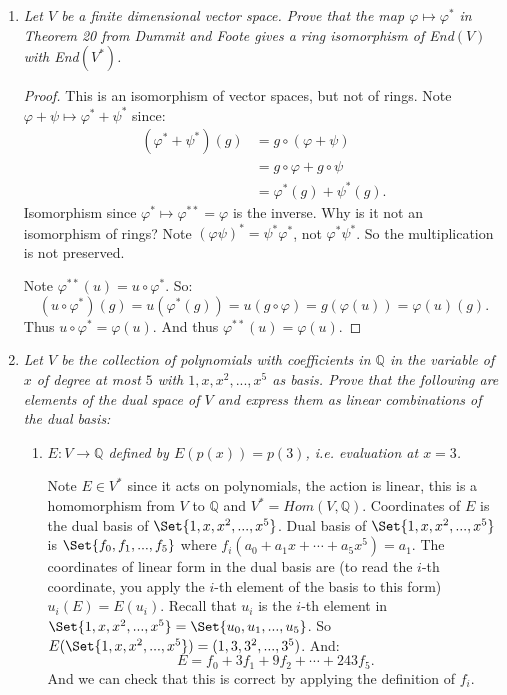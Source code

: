 \documentclass[9pt,reqno,twoside]{amsbook}
\theoremstyle{plain}
\numberwithin{section}{chapter}
\numberwithin{equation}{chapter}
\theoremstyle{definition}
\theoremstyle{remark}
\theoremstyle{plain}
\newcommand{\Q}{\mathbb{Q}}
\newcommand{\bee}{\begin{equation}\begin{aligned}}
\newcommand{\eee}{\end{aligned}\end{equation}}
\renewcommand{\phi}{\varphi}
\begin{document}
\begin{enumerate}[label=\arabic*.]

\item \textit{Let $V$ be a finite dimensional vector space. Prove that the map $\phi\mapsto \phi^*$ in Theorem 20 from Dummit and Foote gives a ring isomorphism of End$(V)$ with End$(V^*)$. }

\begin{proof}
This is an isomorphism of vector spaces, but not of rings. Note $\phi + \psi \mapsto \phi^* + \psi^*$ since:
\bee
(\phi^* + \psi^*)(g) &= g \circ(\phi + \psi)\\
&= g \circ \phi + g \circ \psi\\
&= \phi^*(g) + \psi^*(g).
\eee
Isomorphism since $\phi^* \mapsto \phi^{**} = \phi$ is the inverse. Why is it not an isomorphism of rings? Note $(\phi\psi)^* = \psi^*\phi^*$, not $\phi^*\psi^*$. So the multiplication is not preserved.

Note $\phi^{**}(u) = u \circ \phi^*$. So:
$$
(u \circ \phi^*)(g) = u(\phi^*(g)) = u(g\circ \phi) = g(\phi(u)) = \phi(u)(g).
$$
Thus $u \circ \phi^* = \phi(u)$. And thus $\phi^{**}(u) = \phi(u)$.  
\end{proof}

\item \textit{Let $V$ be the collection of polynomials with coefficients in $\Q$ in the variable of $x$ of degree at most $5$ with $1,x,x^2,...,x^5$ as basis. Prove that the following are elements of the dual space of $V$ and express them as linear combinations of the dual basis: }

\begin{enumerate}
\item \textit{$E:V \to \Q$ defined by $E(p(x)) = p(3)$, i.e. evaluation at $x = 3$. }


Note $E \in V^*$ since it acts on polynomials, the action is linear, this is a homomorphism from $V$ to $\Q$ and $V^* = Hom(V,\Q)$. Coordinates of $E$ is the dual basis of $\Set{1,x,x^2,...,x^5}$. Dual basis of $\Set{1,x,x^2,...,x^5}$ is $\Set{f_0,f_1,...,f_5}$ where $f_i(a_0 + a_1x + \cdots + a_5x^5) = a_1$. The coordinates of linear form in the dual basis are (to read the $i$-th coordinate, you apply the $i$-th element of the basis to this form) $u_i(E) = E(u_i)$. Recall that $u_i$ is the $i$-th element in $\Set{1,x,x^2,...,x^5} = \Set{u_0,u_1,...,u_5}$. So $E(\Set{1,x,x^2,...,x^5}) = (1,3,3^2,...,3^5)$. And:
$$
E = f_0 + 3f_1 + 9f_2 + \cdots + 243f_5.
$$
And we can check that this is correct by applying the definition of $f_i$. 


\end{enumerate}
\end{enumerate}
\end{document}
